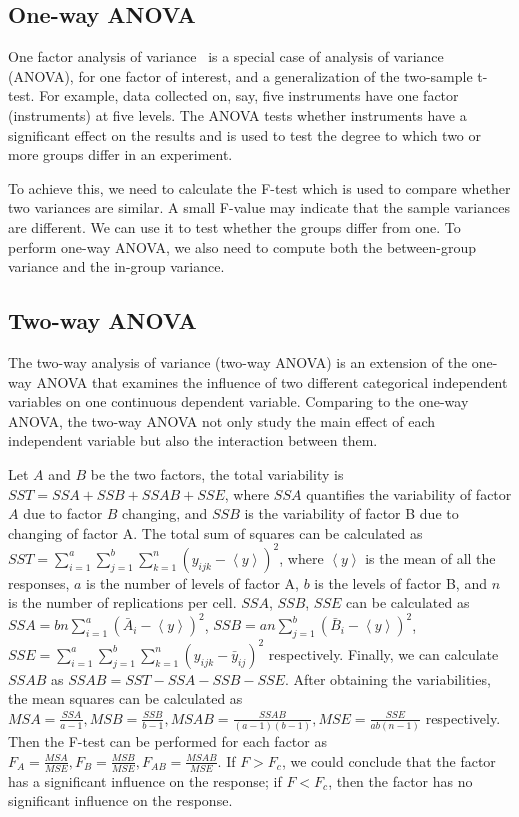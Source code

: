 \documentclass[letterpaper,twocolumn,10pt]{article}
\begin{document}
\subsection{One-way ANOVA}
One factor analysis of variance~\cite{Anova} is a special case of analysis of variance (ANOVA), for one factor of interest, and a generalization of the two-sample t-test. For example, data collected on, say, five instruments have one factor (instruments) at five levels. The ANOVA tests whether instruments have a significant effect on the results and is used to test the degree to which two or more groups differ in an experiment.

To achieve this, we need to calculate the F-test which is used to compare whether two variances are similar. A small F-value may indicate that the sample variances are different. We can use it to test whether the groups differ from one. To perform one-way ANOVA, we also need to compute both the between-group variance and the in-group variance.

\subsection{Two-way ANOVA}
The two-way analysis of variance (two-way ANOVA) is an extension of the one-way ANOVA that examines the influence of two different categorical independent variables on one continuous dependent variable. Comparing to the one-way ANOVA, the two-way ANOVA not only study the main effect of each independent variable but also the interaction between them.

Let $A$ and $B$ be the two factors, the total variability is $SST=SSA+SSB+SSAB+SSE$, where $SSA$ quantifies the variability of factor $A$ due to factor $B$ changing, and $SSB$ is the variability of factor B due to changing of factor A. The total sum of squares can be calculated as $SST=\sum\limits_{i=1}^{a}\sum\limits_{j=1}^{b}\sum\limits_{k=1}^{n}\left( y_{ijk}-\left\langle y\right\rangle \right) ^2$, where $\left\langle y\right\rangle$ is the mean of all the responses, $a$ is the number of levels of factor A, $b$ is the levels of factor B, and $n$ is the number of replications per cell. $SSA$, $SSB$, $SSE$ can be calculated as $SSA=bn\sum\limits_{i=1}^{a}(\bar{A}_i- \left\langle y\right\rangle)^2$, $SSB=an\sum\limits_{j=1}^{b}(\bar{B}_i- \left\langle y\right\rangle)^2$, $SSE=\sum\limits_{i=1}^{a}\sum\limits_{j=1}^{b}\sum\limits_{k=1}^{n}(y_{ijk}-\bar{y}_{ij})^2$ respectively. Finally, we can calculate $SSAB$ as $SSAB=SST-SSA-SSB-SSE$. After obtaining the variabilities, the mean squares can be calculated as $MSA=\frac{SSA}{a-1},MSB=\frac{SSB}{b-1},MSAB=\frac{SSAB}{(a-1)(b-1)},MSE=\frac{SSE}{ab(n-1)}$ respectively. Then the F-test can be performed for each factor as $F_A=\frac{MSA}{MSE},F_B=\frac{MSB}{MSE},F_{AB}=\frac{MSAB}{MSE}$. If $F>F_c$, we could conclude that the factor has a significant influence on the response; if $F<F_c$, then the factor has no significant influence on the response.
\end{document}
